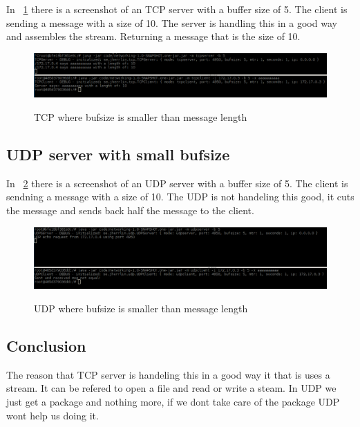 \documentclass[a4paper,12pt]{article} %
\begin{document}
{In ~\ref{fig:assignment13tcp} there is a screenshot of an TCP server with a buffer size of 5.
The client is sending a message with a size of 10. The server is handling this in a good way and assembles the stream.
Returning a message that is the size of 10.

\begin{figure}[H]
    \centering  
    \includegraphics[scale=0.33]{img/assignment13tcp.png}
	\label{fig:assignment13tcp}
	\caption{TCP where bufsize is smaller than message length}
\end{figure}

\subsection{UDP server with small bufsize}

In ~\ref{fig:assignment13udp} there is a screenshot of an UDP server with a buffer size of 5.
The client is sendning a message with a size of 10.
The UDP is not handeling this good, it cuts the message and sends back half the message to the client.

\begin{figure}[H]
    \centering  
    \includegraphics[scale=0.33]{img/assignment13udp.png}
	\label{fig:assignment13udp}
	\caption{UDP where bufsize is smaller than message length}
\end{figure}


\subsection{Conclusion}

The reason that TCP server is handeling this in a good way it that is uses a stream.
It can be refered to open a file and read or write a steam. 
In UDP we just get a package and nothing more, if we dont take care of the package 
UDP wont help us doing it.


\clearpage

}
\end{document}
